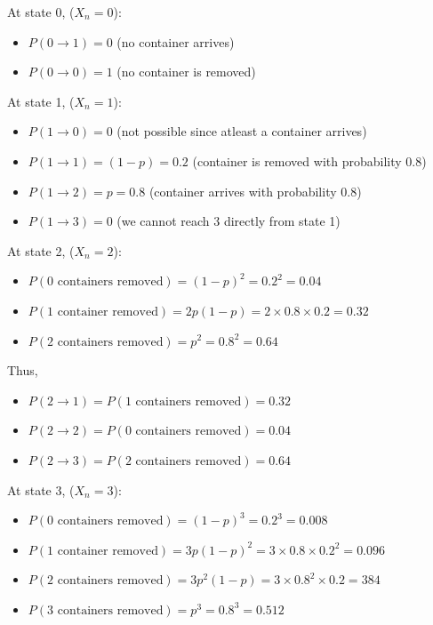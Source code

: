 \documentclass[
]{article}
\begin{document}
At state 0, (\(X_n = 0\)):

\begin{itemize}
\item
  \(P(0 \rightarrow 1) = 0\) (no container arrives)
\item
  \(P(0 \rightarrow 0) = 1\) (no container is removed)
\end{itemize}

At state 1, (\(X_n = 1\)):

\begin{itemize}
\item
  \(P(1 \rightarrow 0) = 0\) (not possible since atleast a container
  arrives)
\item
  \(P(1 \rightarrow 1) = (1 - p) = 0.2\) (container is removed with
  probability 0.8)
\item
  \(P(1 \rightarrow 2) = p = 0.8\) (container arrives with probability
  0.8)
\item
  \(P(1 \rightarrow 3) = 0\) (we cannot reach 3 directly from state 1)
\end{itemize}

At state 2, (\(X_n = 2\)):

\begin{itemize}
\item
  \(P(0 \text{ containers removed}) = (1-p)^2 = 0.2^2 = 0.04\)
\item
  \(P(1 \text{ container removed}) = 2p(1-p) = 2 \times 0.8 \times 0.2 = 0.32\)
\item
  \(P(2 \text{ containers removed}) = p^2 = 0.8^2 = 0.64\)
\end{itemize}

Thus,

\begin{itemize}
\item
  \(P(2 \rightarrow 1) = P(1 \text{ containers removed}) = 0.32\)
\item
  \(P(2 \rightarrow 2) = P(0 \text{ containers removed}) = 0.04\)
\item
  \(P(2 \rightarrow 3) = P(2 \text{ containers removed}) = 0.64\)
\end{itemize}

At state 3, (\(X_n = 3\)):

\begin{itemize}
\item
  \(P(0 \text{ containers removed}) = (1-p)^3 = 0.2^3 = 0.008\)
\item
  \(P(1 \text{ container removed}) = 3p(1-p)^2 = 3 \times 0.8 \times 0.2^2 = 0.096\)
\item
  \(P(2 \text{ containers removed}) = 3p^2(1-p) = 3 \times 0.8^2 \times 0.2 = 384\)
\item
  \(P(3 \text{ containers removed}) = p^3 = 0.8^3 = 0.512\)
\end{itemize}
\end{document}
